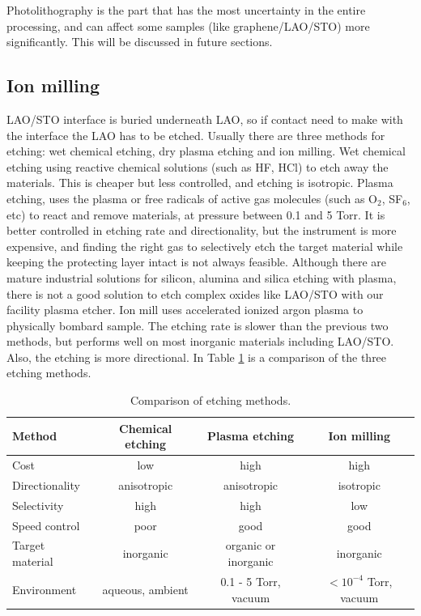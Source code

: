 \documentclass[pdflatex, sectionletters, 12pt]{pittetd}    %
\begin{document}
 Photolithography is the part that has the most uncertainty in the entire processing, and can affect some samples (like graphene/LAO/STO) more significantly. This will be discussed in future sections. 

\subsection{Ion milling}
\label{SEC:IonMilling}
LAO/STO interface is buried underneath LAO, so if contact need to make with the interface the LAO has to be etched. Usually there are three methods for etching: wet chemical etching, dry plasma etching and ion milling. Wet chemical etching using reactive chemical solutions (such as HF, HCl) to etch away the materials. This is  cheaper but less controlled, and etching is isotropic. Plasma etching, uses the plasma or free radicals of active gas molecules (such as O$_2$, SF$_6$, etc) to react and remove materials, at pressure between 0.1 and 5 Torr. It is better controlled in etching rate and directionality, but the instrument is more expensive, and finding the right gas to selectively etch the target material while keeping the protecting layer intact is not always feasible. Although there are mature industrial solutions for silicon, alumina and silica etching with plasma, there is not a good solution to etch complex oxides like LAO/STO with our facility plasma etcher. Ion mill uses accelerated ionized argon plasma to physically bombard sample. The etching rate is slower than the previous two methods, but performs well on most inorganic materials including LAO/STO. Also, the etching is more directional. In Table \ref{TAB:etching} is a comparison of the three etching methods.

\begin{table}
	\centering
	\begin{tabular}{l|ccc}
		\hline
		Method	&	Chemical etching	&	Plasma etching	& Ion milling \\ \hline
		Cost	&	low	& high	& high \\ 
		Directionality	&	anisotropic	&	anisotropic	&	isotropic \\ 
		Selectivity	&	high	&	high	&	low \\
		Speed control	&	poor	&	good	&	good \\
		Target material	&	inorganic	&	organic or inorganic	&	inorganic \\
		Environment	&	aqueous, ambient	&	0.1 - 5 Torr, vacuum	&	$< 10^{-4}$ Torr, vacuum \\
		\hline  
		
	\end{tabular}
	\caption{Comparison of etching methods.}
	\label{TAB:etching}
	
\end{table}
\end{document}
